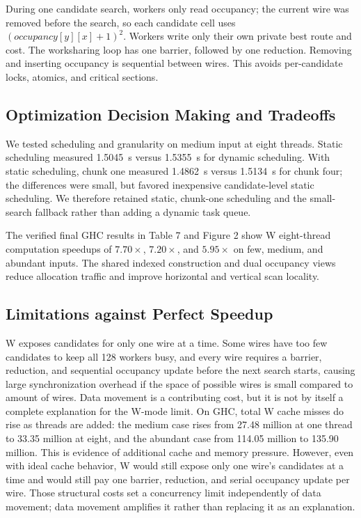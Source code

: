 \documentclass[11pt]{article}
\begin{document}
During one candidate search, workers only read occupancy; the current wire was
removed before the search, so each candidate cell uses
$(occupancy[y][x]+1)^2$. Workers write only their own private best route and
cost. The worksharing loop has one barrier, followed by one reduction. Removing
and inserting occupancy is sequential between wires. This avoids per-candidate
locks, atomics, and critical sections.

\subsection{Optimization Decision Making and Tradeoffs}

We tested scheduling and granularity on medium input at eight threads. Static
scheduling measured 1.5045~s versus 1.5355~s for dynamic scheduling. With
static scheduling, chunk one measured 1.4862~s versus 1.5134~s for chunk four;
the differences were small, but favored inexpensive candidate-level static
scheduling. We therefore retained static, chunk-one scheduling and the
small-search fallback rather than adding a dynamic task queue.

The verified final GHC results in Table 7 and
Figure 2 show W eight-thread computation speedups of
$7.70\times$, $7.20\times$, and $5.95\times$ on few, medium, and abundant
inputs. The shared indexed construction and dual occupancy views reduce
allocation traffic and improve horizontal and vertical scan locality.

\subsection{Limitations against Perfect Speedup}

W exposes candidates for only one wire at a time. Some wires have too few
candidates to keep all 128 workers busy, and every wire requires a barrier,
reduction, and sequential occupancy update before the next search starts, 
causing large synchronization overhead if the space of possible wires is small 
compared to amount of wires.
Data movement is a contributing cost, but it is not by itself a complete
explanation for the W-mode limit.  On GHC, total W cache misses do rise as
threads are added: the medium case rises from 27.48 million at one thread to
33.35 million at eight, and the abundant case from 114.05 million to 135.90
million.  This is evidence of additional cache and memory pressure.  However,
even with ideal cache behavior, W would still expose only one wire's candidates
at a time and would still pay one barrier, reduction, and serial occupancy
update per wire.  Those structural costs set a concurrency limit independently
of data movement; data movement amplifies it rather than replacing it as an
explanation.
\end{document}
